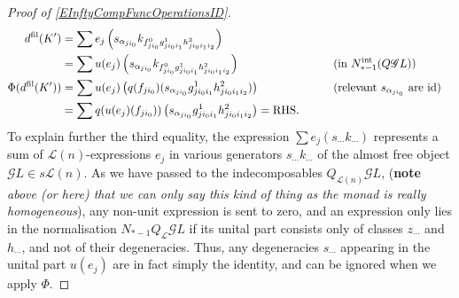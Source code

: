 \documentclass[11pt]{amsart}
\theoremstyle{plain}
\theoremstyle{definition}
\newcommand{\scrQ}{\mathscr{Q}}
\newcommand{\scrR}{\mathscr{R}}
\newcommand{\scrT}{\mathscr{T}}
\newcommand{\scrY}{\mathscr{Y}}
\newcommand{\scrI}{\mathscr{I}}
\newcommand{\scrO}{\mathscr{O}}
\newcommand{\scrP}{\mathscr{P}}
\newcommand{\scrS}{\mathscr{S}}
\newcommand{\scrG}{\mathscr{G}}
\newcommand{\scrH}{\mathscr{H}}
\newcommand{\scrJ}{\mathscr{J}}
\newcommand{\scrK}{\mathscr{K}}
\newcommand{\scrL}{\mathscr{L}}
\newcommand{\scrZ}{\mathscr{Z}}
\newcommand{\scrN}{\mathscr{N}}
\newcommand{\scrM}{\mathscr{M}}
\newcommand{\calL}{\mathcal{L}}
\theoremstyle{plain}
\newcommand{\BSW}{{\scrG}}%
\begin{document}
\begin{Composite functor spectral sequences}
\begin{proof}[Proof of \ref{EInftyCompFuncOperationsID}]
\begin{alignat*}{2}
d^\textup{fil}(K')
&=
\sum e_j\left(s_{\alpha_{ji_0}} k_{f^0_{ji_0}g^1_{ji_0i_1}h^2_{ji_0i_1i_2}}\right)%
\\
&=
\sum u(e_j)\left(s_{\alpha_{ji_0}} k_{f^0_{ji_0}g^1_{ji_0i_1}h^2_{ji_0i_1i_2}}\right)%
&\qquad&\text{(in $N_{*-1}^\textup{int}(Q\BSW L)$)}\\
\Phi(d^\textup{fil}(K'))&=
\sum u(e_j)\left( q(f_{ji_0})(s_{\alpha_{ji_0}}g^1_{ji_0i_1}h^2_{ji_0i_1i_2})\right)%
&\qquad&\text{(relevant $s_{\alpha_{ji_0}}$ are $\textup{id}$)}\\
&=
\sum q(u(e_j)(f_{ji_0}))\left(s_{\alpha_{ji_0}} {g^1_{ji_0i_1}h^2_{ji_0i_1i_2}}\right) =\textup{RHS}.
\end{alignat*}
To explain further the third equality,  the expression $\sum e_j(s_{\cdots }k_{\cdots })$ represents a sum of $\calL(n)$-expressions $e_j$ in various generators $s_{\cdots }k_{\cdots }$ of the almost free object $\BSW L\in s\calL(n)$. As we have passed to the indecomposables $Q_{\calL(n)}\BSW L$, (\textbf{note}\emph{ above (or here) that we can only say this kind of thing as the monad is really homogeneous}), any non-unit expression is sent to zero, and an expression only lies in the normalisation $N_{*-1}Q_{\calL}\BSW L$ if its unital part consists only of classes $z_{\cdots}$ and $h_{\cdots }$, and not of their degeneracies. Thus, any degeneracies $s_{\cdots }$ appearing in the unital part $u(e_j)$ are in fact simply the identity, and can be ignored when we apply $\Phi$.
\end{proof}








\end{Composite functor spectral sequences}
\end{document}
